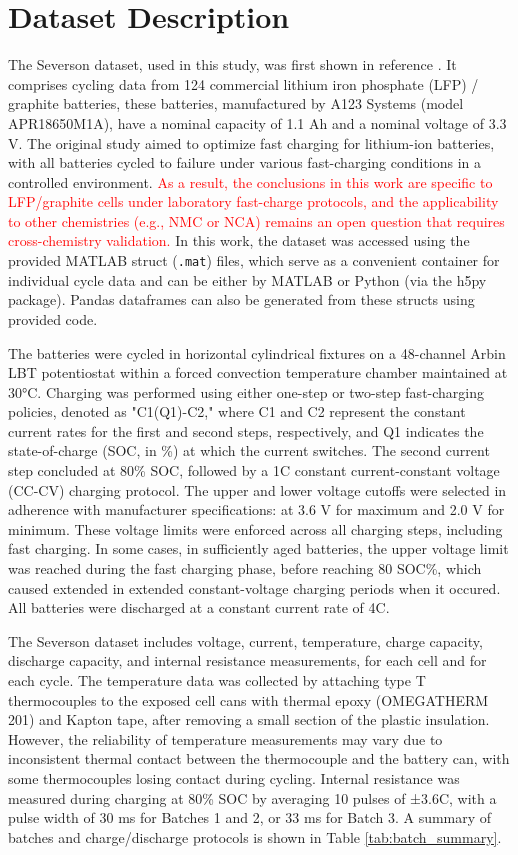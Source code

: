 \section{Dataset Description} \label{sec:dataset}

The Severson dataset, used in this study, was first shown in reference \cite{sev2019}. It comprises cycling data from 124 commercial lithium iron phosphate (LFP) / graphite batteries, these batteries, manufactured by A123 Systems (model APR18650M1A), have a nominal capacity of 1.1 Ah and a nominal voltage of 3.3 V. The original study aimed to optimize fast charging for lithium-ion batteries, with all batteries cycled to failure under various fast-charging conditions in a controlled environment. \textcolor{red}{As a result, the conclusions in this work are specific to LFP/graphite cells under laboratory fast-charge protocols, and the applicability to other chemistries (e.g., NMC or NCA) remains an open question that requires cross-chemistry validation.} In this work, the dataset was accessed using the provided MATLAB struct (\texttt{.mat}) files, which serve as a convenient container for individual cycle data and can be either by MATLAB or Python (via the h5py package). Pandas dataframes can also be generated from these structs using provided code.

The batteries were cycled in horizontal cylindrical fixtures on a 48-channel Arbin LBT potentiostat within a forced convection temperature chamber maintained at 30°C. Charging was performed using either one-step or two-step fast-charging policies, denoted as "C1(Q1)-C2," where C1 and C2 represent the constant current rates for the first and second steps, respectively, and Q1 indicates the state-of-charge (SOC, in \%) at which the current switches. The second current step concluded at 80\% SOC, followed by a 1C constant current-constant voltage (CC-CV) charging protocol. The upper and lower voltage cutoffs were selected in adherence with manufacturer specifications: at 3.6 V for maximum and 2.0 V for minimum. These voltage limits were enforced across all charging steps, including fast charging. In some cases, in sufficiently aged batteries, the upper voltage limit was reached during the fast charging phase, before reaching 80 SOC\%, which caused extended in extended constant-voltage charging periods when it occured. All batteries were discharged at a constant current rate of 4C.

The Severson dataset includes voltage, current, temperature, charge capacity, discharge capacity, and internal resistance measurements, for each cell and for each cycle. The temperature data was collected by attaching type T thermocouples to the exposed cell cans with thermal epoxy (OMEGATHERM 201) and Kapton tape, after removing a small section of the plastic insulation. However, the reliability of temperature measurements may vary due to inconsistent thermal contact between the thermocouple and the battery can, with some thermocouples losing contact during cycling. Internal resistance was measured during charging at 80\% SOC by averaging 10 pulses of ±3.6C, with a pulse width of 30 ms for Batches 1 and 2, or 33 ms for Batch 3. A summary of batches and charge/discharge protocols is shown in Table \ref{tab:batch_summary}.

